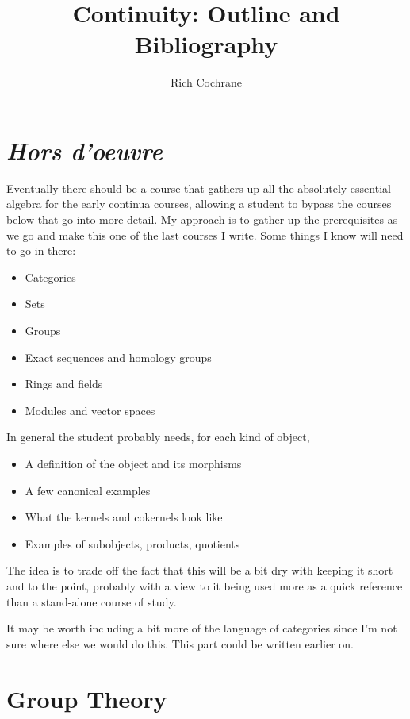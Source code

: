\documentclass[article]{article}
\begin{document}
\title{Continuity: Outline and Bibliography}
\author{Rich Cochrane}
\maketitle

\section{\textit{Hors d'oeuvre}}

Eventually there should be a course that gathers up all the absolutely essential algebra for the early continua courses, allowing a student to bypass the courses below that go into more detail. My approach is to gather up the prerequisites as we go and make this one of the last courses I write. Some things I know will need to go in there:

\begin{itemize}
	\item{Categories}
	\item{Sets}
	\item{Groups}
	\item{Exact sequences and homology groups}
	\item{Rings and fields}
	\item{Modules and vector spaces}
\end{itemize}

In general the student probably needs, for each kind of object,

\begin{itemize}
	\item{A definition of the object and its morphisms}
	\item{A few canonical examples}
	\item{What the kernels and cokernels look like}
	\item{Examples of subobjects, products, quotients}
\end{itemize}

The idea is to trade off the fact that this will be a bit dry with keeping it short and to the point, probably with a view to it being used more as a quick reference than a stand-alone course of study.

It may be worth including a bit more of the language of categories since I'm not sure where else we would do this. This part could be written earlier on.

\section{Group Theory}
\end{document}
